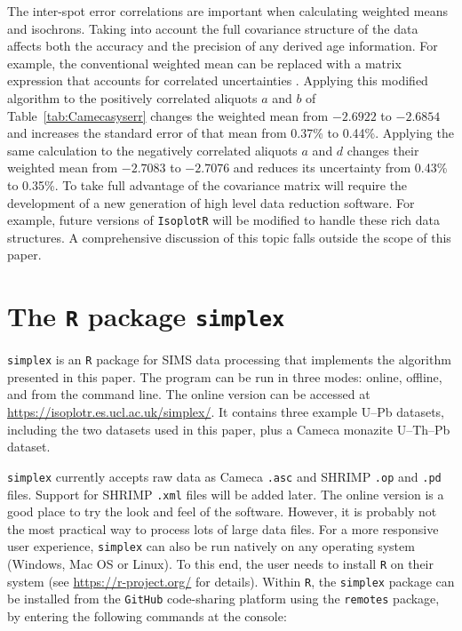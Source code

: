 \documentclass{article}
\begin{document}
The inter-spot error correlations are important when calculating
weighted means \citep{vermeesch2015b} and isochrons. Taking into
account the full covariance structure of the data affects both the
accuracy and the precision of any derived age information.  For
example, the conventional weighted mean can be replaced with a matrix
expression that accounts for correlated uncertainties
\citep[Equation~92 of][]{vermeesch2015b}. Applying this modified
algorithm to the positively correlated aliquots $a$ and $b$ of
Table~\ref{tab:Camecasyserr} changes the weighted mean from $-2.6922$
to $-2.6854$ and increases the standard error of that mean from 0.37\%
to 0.44\%. Applying the same calculation to the negatively correlated
aliquots $a$ and $d$ changes their weighted mean from $-2.7083$ to
$-2.7076$ and reduces its uncertainty from 0.43\% to 0.35\%. To take
full advantage of the covariance matrix will require the development
of a new generation of high level data reduction software.  For
example, future versions of \texttt{IsoplotR} \citep{vermeesch2018c}
will be modified to handle these rich data structures.  A
comprehensive discussion of this topic falls outside the scope of this
paper.

\section{The \texttt{R} package \texttt{simplex}}\label{sec:simplex}

\texttt{simplex} is an \texttt{R} package for SIMS data processing
that implements the algorithm presented in this paper.  The program
can be run in three modes: online, offline, and from the command
line. The online version can be accessed at
\url{https://isoplotr.es.ucl.ac.uk/simplex/}. It contains three example
U--Pb datasets, including the two datasets used in this paper, plus a
Cameca monazite U--Th--Pb dataset.\medskip

\texttt{simplex} currently accepts raw data as Cameca \texttt{.asc}
and SHRIMP \texttt{.op} and \texttt{.pd} files. Support for SHRIMP
\texttt{.xml} files will be added later. The online version is a good
place to try the look and feel of the software. However, it is
probably not the most practical way to process lots of large data
files.  For a more responsive user experience, \texttt{simplex} can
also be run natively on any operating system (Windows, Mac OS or
Linux). To this end, the user needs to install \texttt{R} on their
system (see \url{https://r-project.org/} for details). Within
\texttt{R}, the \texttt{simplex} package can be installed from the
\texttt{GitHub} code-sharing platform using the \texttt{remotes}
package, by entering the following commands at the console:
\end{document}
